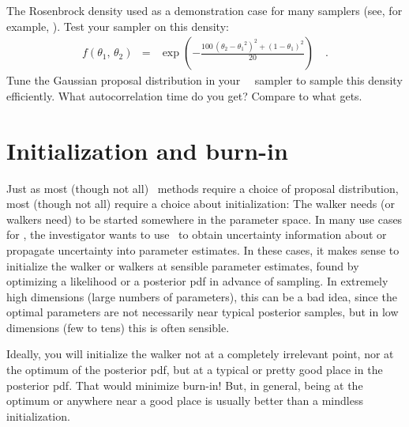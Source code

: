 \documentclass[modern]{aastex61}
\newcommand{\MCMC}{\acronym{MCMC}}
\newcommand{\MH}{\acronym{M--H}}
\begin{document}
\begin{problem}\label{prob:rosenbrock}
The Rosenbrock density used as a demonstration case for many samplers (see, for example, \citealt{gw}).
Test your sampler on this density:
\begin{eqnarray}\label{eq:rosenbrock}
f(\theta_1,\,\theta_2) &=&
    \exp\left(-\frac{100\,(\theta_2-{\theta_1}^2)^2+(1-\theta_1)^2}{20}\right)
\quad.
\end{eqnarray}
Tune the Gaussian proposal distribution in your \MH\ \MCMC\ sampler to sample this density efficiently.
What autocorrelation time do you get?
Compare to what  gets.
\end{problem}

\section{Initialization and burn-in}\label{sec:initialization}
\nopagebreak
Just as most (though not all) \MCMC\ methods require a choice of
proposal distribution, most (though not all) require a choice about
initialization:
The walker needs (or walkers need) to be started somewhere in the
parameter space.
In many use cases for \MCMC, the investigator wants to use \MCMC\ to obtain
uncertainty information about or propagate uncertainty into parameter
estimates.
In these cases, it makes sense to initialize the walker or walkers at
sensible parameter estimates, found by optimizing a likelihood or a
posterior pdf in advance of sampling.
In extremely high dimensions (large numbers of parameters), this can
be a bad idea, since the optimal parameters are not necessarily near
typical posterior samples, but
in low dimensions (few to tens) this is often sensible.

Ideally, you will initialize the walker not at a completely irrelevant
point, nor at the optimum of the posterior pdf, but at a typical or
pretty good place in the posterior pdf.
That would minimize burn-in!
But, in general, being at the optimum or anywhere near a good place is
usually better than a mindless initialization.
\end{document}
